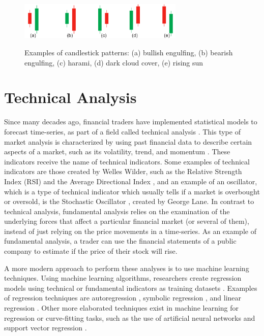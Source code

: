 \begin{figure}
\caption{Examples of candlestick patterns: (a) bullish engulfing, (b) bearish engulfing, (c) harami, (d) dark cloud cover, (e) rising sun}
\centering
\includegraphics[width=0.7\textwidth]{img/candlestick-patterns.png}
\label{figure:candlestick-patterns}
\end{figure}

\section{Technical Analysis}
\label{section:technical-analysis}

Since many decades ago, financial traders have implemented statistical models to
forecast time-series, as part of a field called technical analysis
\cite{Lo2000}. This type of market analysis is characterized by using past
financial data to describe certain aspects of a market, such as its volatility,
trend, and momentum \cite{Achelis2000}. These indicators receive the name of
technical indicators. Some examples of technical indicators are those created by
Welles Wilder, such as the Relative Strength Index (RSI) and the Average
Directional Index \cite{Wilder1978}, and an example of an oscillator, which is a
type of technical indicator which usually tells if a market is overbought or
oversold, is the Stochastic Oscillator \cite{Schirding1984}, created by George
Lane. In contrast to technical analysis, fundamental analysis relies on the
examination of the underlying forces that affect a particular financial market
(or several of them), instead of just relying on the price movements in a
time-series. As an example of fundamental analysis, a trader can use the
financial statements of a public company to estimate if the price of their stock
will rise.

A more modern approach to perform these analyses is to use machine learning
techniques. Using machine learning algorithms, researchers create regression
models using technical or fundamental indicators as training datasets
\cite{Connor2005}.  Examples of regression techniques are autoregression
\cite{burg1968new}, symbolic regression \cite{billard2002symbolic}, and linear
regression \cite{kutner2004applied}. Other more elaborated techniques exist in
machine learning for regression or curve-fitting tasks, such as the use of
artificial neural networks \cite{melin2007hybrid} and support vector regression
\cite{basak2007support}.

